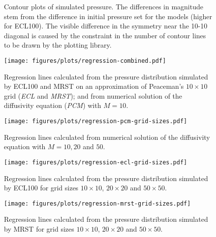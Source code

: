 \begin{figure}
    \begin{minipage}[b]{.5\linewidth}
        \centering\scalebox{.52}{}
        \label{fig:contour-ecl10}
    \end{minipage}%
    \begin{minipage}[b]{.5\linewidth}
        \centering\scalebox{.52}{}
        \label{fig:contour-mrst10}
    \end{minipage}
    \caption{Contour plots of simulated pressure. The differences in magnitude stem from the difference in initial pressure set for the models (higher for ECL100). The visible difference in the symmetry near the 10-10 diagonal is caused by the constraint in the number of contour lines to be drawn by the plotting library.}
    \label{fig:contours-ect10-mrst10}
\end{figure}


\begin{figure}[htbp]
    \centering
    \texttt{[image: figures/plots/regression-combined.pdf]}
    \caption{Regression lines calculated from the pressure distribution simulated by ECL100 and MRST on an approximation of Peaceman's $10\times 10$ grid (\emph{ECL} and \emph{MRST}); and from numerical solution of the diffusivity equation (\emph{PCM}) with $M=10$.}
    \label{fig:regression-combined}
\end{figure}

\begin{figure}[htbp]
    \centering
    \texttt{[image: figures/plots/regression-pcm-grid-sizes.pdf]}
    \caption{Regression lines calculated from numerical solution of the diffusivity equation with $M=10,20$ and $50$.}
    \label{fig:regression-pcm-grid-sizes}
\end{figure}

\begin{figure}[htbp]
    \centering
    \texttt{[image: figures/plots/regression-ecl-grid-sizes.pdf]}
    \caption{Regression lines calculated from the pressure distribution simulated by ECL100 for grid sizes $10\times 10$, $20\times 20$ and $50\times 50$.}
    \label{fig:regression-ecl-grid-sizes}
\end{figure}

\begin{figure}[htbp]
    \centering
    \texttt{[image: figures/plots/regression-mrst-grid-sizes.pdf]}
    \caption{Regression lines calculated from the pressure distribution simulated by MRST for grid sizes $10\times 10$, $20\times 20$ and $50\times 50$.}
    \label{fig:regression-mrst-grid-sizes}
\end{figure}



